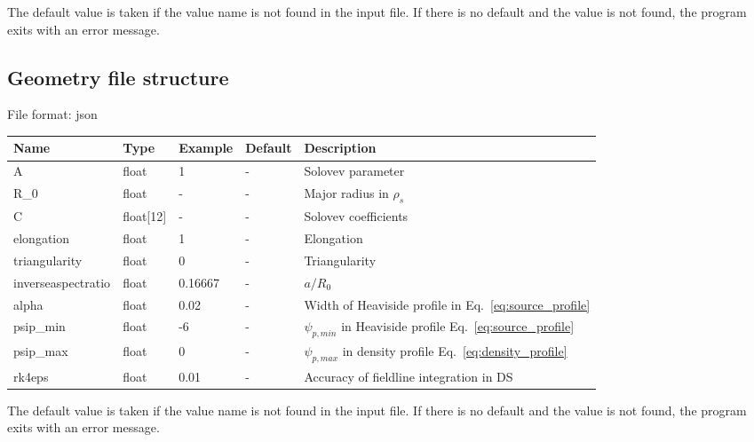 The default value is taken if the value name is not found in the input file. If there is no default and
the value is not found,
the program exits with an error message.
\subsection{Geometry file structure}
File format: json

\begin{longtable}{llll>{\RaggedRight}p{7cm}}
\toprule
\rowcolor{gray!50}\textbf{Name} &  \textbf{Type} & \textbf{Example} & \textbf{Default} & \textbf{Description}  \\ \midrule
    A      & float & 1 &  - & Solovev parameter \\
    R\_0   & float & - & -  & Major radius in $\rho_s$ \\
    C      & float[12] &  - & - & Solovev coefficients \\
    elongation & float & 1 & - & Elongation \\
    triangularity & float & 0 & - & Triangularity \\
    inverseaspectratio & float & 0.16667 & - & $a/R_0$ \\
    alpha  & float & 0.02 & - & Width of Heaviside profile in Eq.~\eqref{eq:source_profile} \\
    psip\_min & float & -6 & - & $\psi_{p,min}$ in Heaviside profile Eq.~\eqref{eq:source_profile} \\
    psip\_max & float & 0 & - & $\psi_{p,max}$ in density profile Eq.~\eqref{eq:density_profile} \\
    rk4eps & float & 0.01 & - & Accuracy of fieldline integration in DS \\
\bottomrule
\end{longtable}
The default value is taken if the value name is not found in the input file. If there is no default and
the value is not found,
the program exits with an error message.

